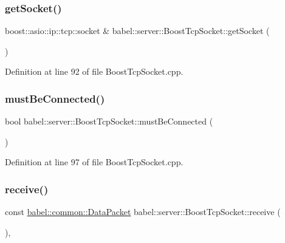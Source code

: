 \subsubsection{\texorpdfstring{get\+Socket()}{getSocket()}}
{\footnotesize\ttfamily boost\+::asio\+::ip\+::tcp\+::socket \& babel\+::server\+::\+Boost\+Tcp\+Socket\+::get\+Socket (\begin{DoxyParamCaption}{ }\end{DoxyParamCaption})}



Definition at line 92 of file Boost\+Tcp\+Socket.\+cpp.

\mbox{\label{classbabel_1_1server_1_1_boost_tcp_socket_aa36010743728795b7b48909f7d22c432}} 
\subsubsection{\texorpdfstring{must\+Be\+Connected()}{mustBeConnected()}}
{\footnotesize\ttfamily bool babel\+::server\+::\+Boost\+Tcp\+Socket\+::must\+Be\+Connected (\begin{DoxyParamCaption}{ }\end{DoxyParamCaption})}



Definition at line 97 of file Boost\+Tcp\+Socket.\+cpp.

\mbox{\label{classbabel_1_1server_1_1_boost_tcp_socket_a0f59c22aa0755aece70891287352bf5c}} 
\subsubsection{\texorpdfstring{receive()}{receive()}}
{\footnotesize\ttfamily const \mbox{\hyperlink{classbabel_1_1common_1_1_data_packet}{babel\+::common\+::\+Data\+Packet}} babel\+::server\+::\+Boost\+Tcp\+Socket\+::receive (\begin{DoxyParamCaption}{ }\end{DoxyParamCaption})\hspace{0.3cm}{\ttfamily [override]}, {\ttfamily [virtual]}}



